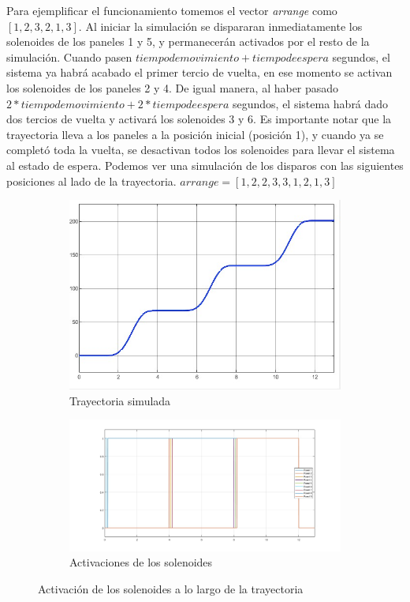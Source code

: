 Para ejemplificar el funcionamiento tomemos el vector \textit{arrange} como $[1,2,3,2,1,3]$. Al iniciar la simulación se dispararan inmediatamente los solenoides de los paneles 1 y 5, y permanecerán activados por el resto de la simulación. Cuando pasen $tiempo de movimiento + tiempo de espera$ segundos, el sistema ya habrá acabado el primer tercio de vuelta, en ese momento se activan los solenoides de los paneles 2 y 4. De igual manera, al haber pasado $2*tiempo de movimiento + 2*tiempo de espera$ segundos, el sistema habrá dado dos tercios de vuelta y activará los solenoides 3 y 6. Es importante notar que la trayectoria lleva a los paneles a la posición inicial (posición 1), y cuando ya se completó toda la vuelta, se desactivan todos los solenoides para llevar el sistema al estado de espera. Podemos ver una simulación de los disparos con las siguientes posiciones al lado de la trayectoria. $arrange = [1,2,2,3,3,1,2,1,3]$
\begin{figure}[!htb]
    \centering
    \begin{subfigure}{0.4\textwidth}
        \centering
        \includegraphics[width=\linewidth]{imagenes/Trajectory.jpg}
        \caption{\footnotesize Trayectoria simulada}
        \label{fig:Coils1}
    \end{subfigure}
    \hfill
    \begin{subfigure}{0.6\textwidth}
        \centering
        \includegraphics[width=\linewidth]{imagenes/AllCoilActivations.jpg}
        \caption{\footnotesize Activaciones de los solenoides}
        \label{fig:Coils2}
    \end{subfigure}
    \hfill
    \caption{Activación de los solenoides a lo largo de la trayectoria}
\end{figure}
\FloatBarrier

